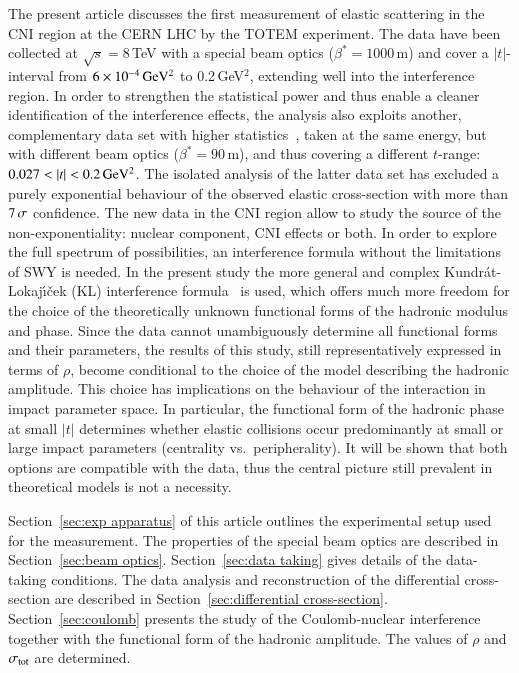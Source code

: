 The present article discusses the first measurement of elastic scattering in the CNI region at the CERN LHC by the TOTEM experiment. The data have been collected at $\sqrt{s} = 8\,$TeV with a special beam optics ($\beta^{*}=1000\,$m) and cover a $|t|$-interval from $6\times10^{-4}\,\rm GeV^{2}$ to 0.2\,GeV$^{2}$, extending well into the interference region. In order to strengthen the statistical power and thus enable a cleaner identification of the interference effects, the analysis also exploits another, complementary data set with higher statistics~\cite{8tev-90m}, taken at the same energy, but with different beam optics ($\beta^{*}=90\,$m), and thus covering a different $t$-range: $0.027 < |t| < 0.2\,{\rm GeV^2}$. The isolated analysis of the latter data set has excluded a purely exponential behaviour of the observed elastic cross-section with more than $7\,{\rm \sigma}$ confidence. The new data in the CNI region allow to study the source of the non-exponentiality: nuclear component, CNI effects or both. In order to explore the full spectrum of possibilities, an interference formula without the limitations of SWY is needed. In the present study the more general and complex Kundr\'{a}t-Lokaj\'{\i}\v{c}ek (KL) interference formula~\cite{kl94} is used, which offers much more freedom for the choice of the theoretically unknown functional forms of the hadronic modulus and phase. Since the data cannot unambiguously determine all functional forms and their parameters, the results of this study, still representatively expressed in terms of $\rho$, become conditional to the choice of the model describing the hadronic amplitude. This choice has implications on the behaviour of the interaction in impact parameter space. In particular, the functional form of the hadronic phase at small $|t|$ determines whether elastic collisions occur predominantly at small or large impact parameters (centrality vs.~peripherality). It will be shown that both options are compatible with the data, thus the central picture still prevalent in theoretical models is not a necessity.

Section~\ref{sec:exp apparatus} of this article outlines the experimental setup used for the measurement. The properties of the special beam optics are described in Section~\ref{sec:beam optics}. Section~\ref{sec:data taking} gives details of the data-taking conditions. The data analysis and reconstruction of the differential cross-section are described in Section~\ref{sec:differential cross-section}. Section~\ref{sec:coulomb} presents the study of the Coulomb-nuclear interference together with the functional form of the hadronic amplitude. The values of $\rho$ and $\sigma_{\rm tot}$ are determined.
